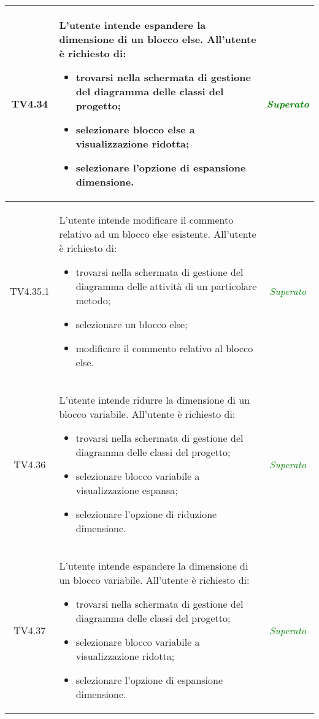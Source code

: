 \begin{longtable}{|c|>{}m{8cm}|c|}
\hypertarget{TV4.34}{TV4.34} & L'utente intende espandere la dimensione di un blocco else.
All'utente è richiesto di:
\begin{itemize}
	\item trovarsi nella schermata di gestione del diagramma delle classi del progetto;
	\item selezionare blocco else a visualizzazione ridotta;
	\item selezionare l'opzione di espansione dimensione.
\end{itemize} & \textcolor{Green}{\textit{Superato}}\\ \hline

\hypertarget{TV4.35.1}{TV4.35.1} & L'utente intende modificare il commento relativo ad un blocco else esistente.
All'utente è richiesto di:
\begin{itemize}
	\item trovarsi nella schermata di gestione del diagramma delle attività di un particolare metodo;
	\item selezionare un blocco else;
	\item modificare il commento relativo al blocco else.
\end{itemize} & \textcolor{Green}{\textit{Superato}}\\ \hline

\hypertarget{TV4.36}{TV4.36} & L'utente intende ridurre la dimensione di un blocco variabile.
All'utente è richiesto di:
\begin{itemize}
	\item trovarsi nella schermata di gestione del diagramma delle classi del progetto;
	\item selezionare blocco variabile a visualizzazione espansa;
	\item selezionare l'opzione di riduzione dimensione.
\end{itemize} & \textcolor{Green}{\textit{Superato}}\\ \hline

\hypertarget{TV4.37}{TV4.37} & L'utente intende espandere la dimensione di un blocco variabile.
All'utente è richiesto di:
\begin{itemize}
	\item trovarsi nella schermata di gestione del diagramma delle classi del progetto;
	\item selezionare blocco variabile a visualizzazione ridotta;
	\item selezionare l'opzione di espansione dimensione.
\end{itemize} & \textcolor{Green}{\textit{Superato}}\\ \hline


\end{longtable}
